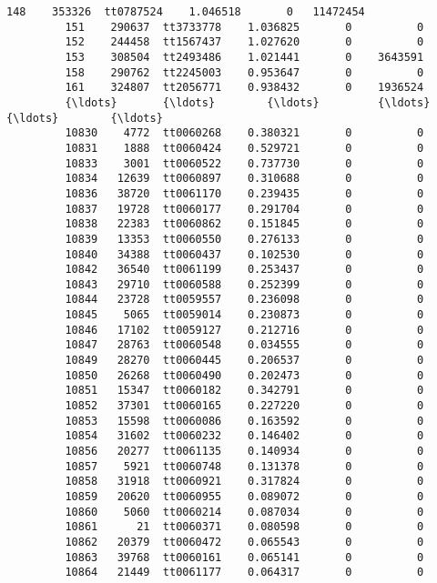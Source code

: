 \documentclass[11pt]{article}
\begin{document}
\begin{Verbatim}[commandchars=\\\{\}]
         148    353326  tt0787524    1.046518       0   11472454   
         151    290637  tt3733778    1.036825       0          0   
         152    244458  tt1567437    1.027620       0          0   
         153    308504  tt2493486    1.021441       0    3643591   
         158    290762  tt2245003    0.953647       0          0   
         161    324807  tt2056771    0.938432       0    1936524   
         {\ldots}       {\ldots}        {\ldots}         {\ldots}     {\ldots}        {\ldots}   
         10830    4772  tt0060268    0.380321       0          0   
         10831    1888  tt0060424    0.529721       0          0   
         10833    3001  tt0060522    0.737730       0          0   
         10834   12639  tt0060897    0.310688       0          0   
         10836   38720  tt0061170    0.239435       0          0   
         10837   19728  tt0060177    0.291704       0          0   
         10838   22383  tt0060862    0.151845       0          0   
         10839   13353  tt0060550    0.276133       0          0   
         10840   34388  tt0060437    0.102530       0          0   
         10842   36540  tt0061199    0.253437       0          0   
         10843   29710  tt0060588    0.252399       0          0   
         10844   23728  tt0059557    0.236098       0          0   
         10845    5065  tt0059014    0.230873       0          0   
         10846   17102  tt0059127    0.212716       0          0   
         10847   28763  tt0060548    0.034555       0          0   
         10849   28270  tt0060445    0.206537       0          0   
         10850   26268  tt0060490    0.202473       0          0   
         10851   15347  tt0060182    0.342791       0          0   
         10852   37301  tt0060165    0.227220       0          0   
         10853   15598  tt0060086    0.163592       0          0   
         10854   31602  tt0060232    0.146402       0          0   
         10856   20277  tt0061135    0.140934       0          0   
         10857    5921  tt0060748    0.131378       0          0   
         10858   31918  tt0060921    0.317824       0          0   
         10859   20620  tt0060955    0.089072       0          0   
         10860    5060  tt0060214    0.087034       0          0   
         10861      21  tt0060371    0.080598       0          0   
         10862   20379  tt0060472    0.065543       0          0   
         10863   39768  tt0060161    0.065141       0          0   
         10864   21449  tt0061177    0.064317       0          0   
         

\end{Verbatim}
\end{document}
